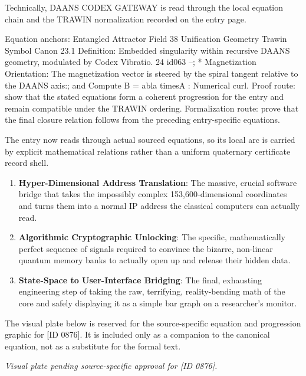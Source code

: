 Technically, DAANS CODEX GATEWAY is read through the local equation chain and the TRAWIN normalization recorded on the entry page.

Equation anchors: Entangled Attractor Field 38 Unification Geometry Trawin Symbol Canon 23.1 Definition: Embedded singularity within recursive DAANS geometry, modulated by Codex Vibratio. 24 id063 --; * Magnetization Orientation: The magnetization vector is steered by the spiral tangent relative to the DAANS axis:; and Compute B = abla timesA : Numerical curl. Proof route: show that the stated equations form a coherent progression for the entry and remain compatible under the TRAWIN ordering. Formalization route: prove that the final closure relation follows from the preceding entry-specific equations.

The entry now reads through actual sourced equations, so its local arc is carried by explicit mathematical relations rather than a uniform quaternary certificate record shell.
\endgroup

\begin{enumerate}[leftmargin=1.6em,itemsep=6pt,topsep=4pt]
\item \textbf{Hyper-Dimensional Address Translation}: The massive, crucial software bridge that takes the impossibly complex 153,600-dimensional coordinates and turns them into a normal IP address the classical computers can actually read.
\item \textbf{Algorithmic Cryptographic Unlocking}: The specific, mathematically perfect sequence of signals required to convince the bizarre, non-linear quantum memory banks to actually open up and release their hidden data.
\item \textbf{State-Space to User-Interface Bridging}: The final, exhausting engineering step of taking the raw, terrifying, reality-bending math of the core and safely displaying it as a simple bar graph on a researcher's monitor.
\end{enumerate}

\begingroup\footnotesize\sloppy
The visual plate below is reserved for the source-specific equation and progression graphic for [ID 0876]. It is included only as a companion to the canonical equation, not as a substitute for the formal text.
\par\endgroup
\begingroup\footnotesize\itshape
Visual plate pending source-specific approval for [ID 0876].
\par\endgroup

